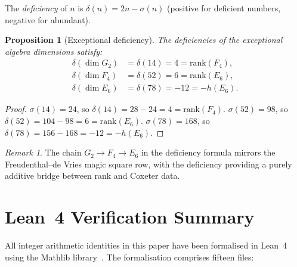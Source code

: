 \documentclass[11pt]{amsart}
\theoremstyle{plain}
\newtheorem{proposition}[theorem]{Proposition}
\theoremstyle{definition}
\theoremstyle{remark}
\newtheorem{remark}[theorem]{Remark}
\begin{document}
The \emph{deficiency} of $n$ is $\delta(n) = 2n - \sigma(n)$ (positive
for deficient numbers, negative for abundant).

\begin{proposition}[Exceptional deficiency]\label{prop:deficiency-bridge}
The deficiencies of the exceptional algebra dimensions satisfy:
\begin{align*}
  \delta(\dim G_2) &= \delta(14) = 4 = \mathrm{rank}(F_4),\\
  \delta(\dim F_4) &= \delta(52) = 6 = \mathrm{rank}(E_6),\\
  \delta(\dim E_6) &= \delta(78) = -12 = -h(E_6).
\end{align*}
\end{proposition}

\begin{proof}
$\sigma(14)=24$, so $\delta(14)=28-24=4=\mathrm{rank}(F_4)$.
$\sigma(52)=98$, so $\delta(52)=104-98=6=\mathrm{rank}(E_6)$.
$\sigma(78)=168$, so $\delta(78)=156-168=-12=-h(E_6)$.
\end{proof}

\begin{remark}
The chain $G_2 \to F_4 \to E_6$ in the deficiency formula mirrors the
Freudenthal--de Vries magic square row, with the deficiency providing
a purely additive bridge between rank and Coxeter data.
\end{remark}

\appendix
\section{Lean~4 Verification Summary}\label{app:lean}

All integer arithmetic identities in this paper have been formalised in
Lean~4 using the Mathlib library~\cite{Mathlib2024}.  The formalisation
comprises fifteen files:
\end{document}
